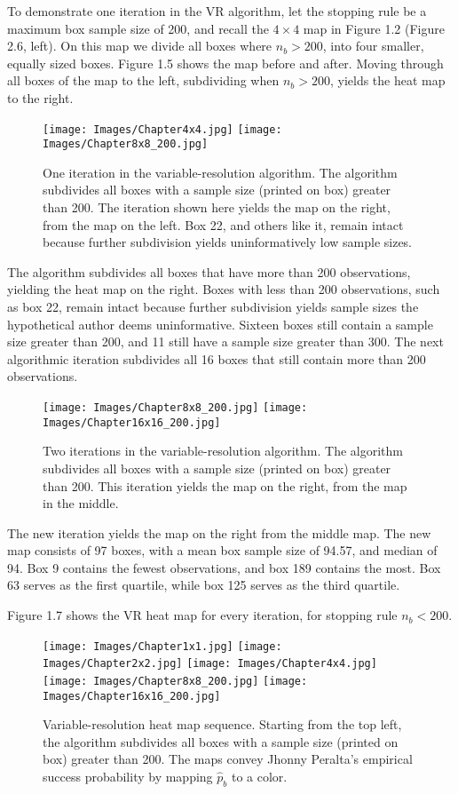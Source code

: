 To demonstrate one iteration in the VR algorithm, let the stopping rule be a maximum box sample size of 200, and recall the $4 \times 4$ map in Figure 1.2 (Figure 2.6, left). On this map we divide all boxes where $n_{b} > 200$, into four smaller, equally sized boxes. Figure 1.5 shows the map before and after. Moving through all boxes of the map to the left, subdividing when $n_{b} > 200$, yields the heat map to the right.
        \begin{figure}[H]
      	\centering
      	\texttt{[image: Images/Chapter4x4.jpg]} 
      	\texttt{[image: Images/Chapter8x8\_200.jpg]} 
      	\caption{One iteration in the variable-resolution algorithm. The algorithm subdivides all boxes with a sample size (printed on box) greater than 200. The iteration shown here yields the map on the right, from the map on the left. Box 22, and others like it, remain intact because further subdivision yields uninformatively low sample sizes.}
      	\end{figure} 
The algorithm subdivides all boxes that have more than 200 observations, yielding the heat map on the right. Boxes with less than 200 observations, such as box 22, remain intact because further subdivision yields sample sizes the hypothetical author deems uninformative. Sixteen boxes still contain a sample size greater than 200, and 11 still have a sample size greater than 300. The next algorithmic iteration subdivides all 16 boxes that still contain more than 200 observations. 
        \begin{figure}[H]
      	\centering
      	\texttt{[image: Images/Chapter8x8\_200.jpg]} 
      	\texttt{[image: Images/Chapter16x16\_200.jpg]} 
      	\caption{Two iterations in the variable-resolution algorithm. The algorithm subdivides all boxes with a sample size (printed on box) greater than 200. This iteration yields the map on the right, from the map in the middle.}
      	\end{figure}
The new iteration yields the map on the right from the middle map. The new map consists of 97 boxes, with a mean box sample size of 94.57, and median of 94. Box 9 contains the fewest observations, and box 189 contains the most. Box 63 serves as the first quartile, while box 125 serves as the third quartile. 

Figure 1.7 shows the VR heat map for every iteration, for stopping rule $n_{b} < 200$.
        \begin{figure}[H]
      	\centering
      	\texttt{[image: Images/Chapter1x1.jpg]}
      	\texttt{[image: Images/Chapter2x2.jpg]}
      	\texttt{[image: Images/Chapter4x4.jpg]}
      	\texttt{[image: Images/Chapter8x8\_200.jpg]} 
      	\texttt{[image: Images/Chapter16x16\_200.jpg]} 
      	\caption{Variable-resolution heat map sequence. Starting from the top left, the algorithm subdivides all boxes with a sample size (printed on box) greater than 200. The maps convey Jhonny Peralta's empirical success probability by mapping $\hat{p}_{b}$ to a color.}
      	\end{figure}
      	
